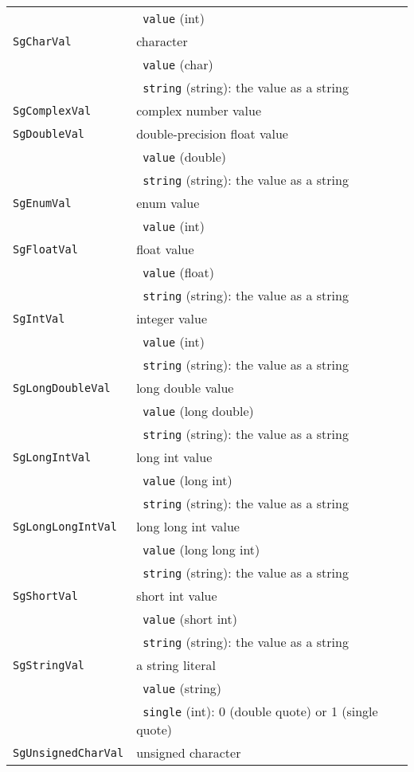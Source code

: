 \begin{longtable}[l]{l|p{10cm}}
 & ~\texttt{value} (int) \\
 \texttt{SgCharVal}& character \\
 & ~\texttt{value} (char) \\
 & ~\texttt{string} (string): the value as a string \\
 \texttt{SgComplexVal}& complex number value \\
 \texttt{SgDoubleVal}& double-precision float value \\
 & ~\texttt{value} (double) \\
 & ~\texttt{string} (string): the value as a string \\
 \texttt{SgEnumVal}& enum value \\
 & ~\texttt{value} (int) \\
 \texttt{SgFloatVal}& float value \\
 & ~\texttt{value} (float) \\
 & ~\texttt{string} (string): the value as a string \\
 \texttt{SgIntVal}& integer value\\
 & ~\texttt{value} (int) \\
 & ~\texttt{string} (string): the value as a string \\
 \texttt{SgLongDoubleVal}& long double value\\
 & ~\texttt{value} (long double) \\
 & ~\texttt{string} (string): the value as a string \\
 \texttt{SgLongIntVal}& long int value \\
 & ~\texttt{value} (long int) \\
 & ~\texttt{string} (string): the value as a string \\
 \texttt{SgLongLongIntVal}& long long int value\\
 & ~\texttt{value} (long long int) \\
 & ~\texttt{string} (string): the value as a string \\
 \texttt{SgShortVal}& short int value\\
 & ~\texttt{value} (short int) \\
 & ~\texttt{string} (string): the value as a string \\
 \texttt{SgStringVal}& a string literal\\
 & ~\texttt{value} (string) \\
 & ~\texttt{single} (int): 0 (double quote) or 1 (single quote)\\
 \texttt{SgUnsignedCharVal}& unsigned character\\

\end{longtable}
